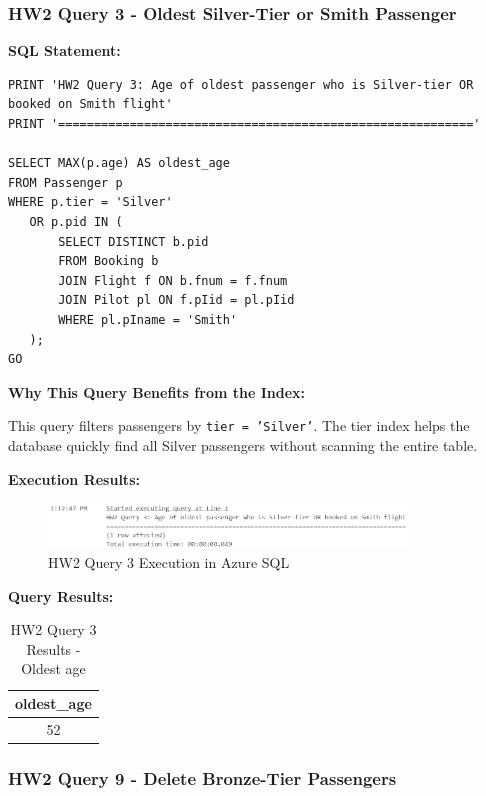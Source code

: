 \documentclass[12pt]{article}
\begin{document}
\newpage

\subsubsection{HW2 Query 3 - Oldest Silver-Tier or Smith Passenger}

\textbf{SQL Statement:}
\begin{lstlisting}
PRINT 'HW2 Query 3: Age of oldest passenger who is Silver-tier OR booked on Smith flight'
PRINT '=========================================================='

SELECT MAX(p.age) AS oldest_age
FROM Passenger p
WHERE p.tier = 'Silver'
   OR p.pid IN (
       SELECT DISTINCT b.pid
       FROM Booking b
       JOIN Flight f ON b.fnum = f.fnum
       JOIN Pilot pl ON f.pIid = pl.pIid
       WHERE pl.pIname = 'Smith'
   );
GO
\end{lstlisting}

\textbf{Why This Query Benefits from the Index:}

This query filters passengers by \texttt{tier = 'Silver'}. The tier index helps the database quickly find all Silver passengers without scanning the entire table.

\textbf{Execution Results:}

\begin{figure}[h]
\centering
\includegraphics[width=0.85\textwidth]{../../../Screenshots/Problem2/Query3_Execution.png}
\caption{HW2 Query 3 Execution in Azure SQL}
\label{fig:query3_execution}
\end{figure}

\textbf{Query Results:}

\begin{table}[h]
\centering
\begin{tabular}{|c|}
\hline
\textbf{oldest\_age} \\
\hline
52 \\
\hline
\end{tabular}
\caption{HW2 Query 3 Results - Oldest age}
\end{table}

\newpage
\subsubsection{HW2 Query 9 - Delete Bronze-Tier Passengers}
\end{document}

